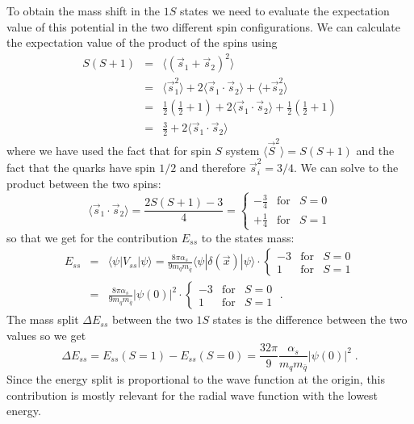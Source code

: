 \documentclass[12pt]{article}
\begin{document}
To obtain the mass shift in the $1S$ states we need to evaluate the expectation value of this potential in the two different spin configurations. We can calculate the expectation value of the product of the spins using
\begin{eqnarray*}
S(S+1)&=&\langle (\vec s_1 +\vec s_2)^2 \rangle\\
 &=& 
\langle \vec s_1 ^2 \rangle +2\langle \vec s_1 \cdot\vec s_2 \rangle +\langle +\vec s_2^2 \rangle \\
&=&
\frac{1}{2}\left(\frac{1}{2}+1\right)+2\langle \vec s_1 \cdot\vec s_2 \rangle + \frac{1}{2}\left(\frac{1}{2}+1\right)
\\&=&
\frac{3}{2}+2\langle \vec s_1 \cdot\vec s_2 \rangle
\end{eqnarray*}  
where we have used the fact that for spin $S$ system $\langle \vec S^2 \rangle=S(S+1)$ and the fact that the quarks have spin $1/2$ and therefore $\vec s_i^2=3/4$. We can solve to the product between the two spins:
\[\langle \vec s_1 \cdot\vec s_2 \rangle=\frac{2S(S+1)-3}{4}=\left\{\begin{array}{ccc}-\frac{3}{4}&\mbox{for}& S=0 \\ +\frac{1}{4}&\mbox{for}& S=1 \end{array}\right.\]
so that we get for the contribution $E_{ss}$ to the states mass:
\begin{eqnarray}\label{eq:1sMassSplit}
E_{ss}&=&
\langle \psi |V_{ss}|\psi\rangle = 
\frac{8\pi \alpha_s }{9m_q m_{\bar q}}\langle \psi|\delta(\vec x)|\psi\rangle \cdot\left\{\begin{array}{ccc}-3&\mbox{for}& S=0 \\ 1&\mbox{for}& S=1 \end{array}\right. \nonumber
\\
&=&
\frac{8\pi \alpha_s }{9m_q m_{\bar q}}\left|\psi(0)\right|^2 \cdot\left\{\begin{array}{ccc}-3&\mbox{for}& S=0 \\ 1&\mbox{for}& S=1 \end{array}\right. \;.
\end{eqnarray}
The mass split $\Delta E_{ss}$ between the two $1S$ states is the difference between the two values so we get
\[\Delta E_{ss}=E_{ss}(S=1)-E_{ss}(S=0)=\frac{32\pi}{9}\frac{\alpha_s }{m_q m_{\bar q}}\left|\psi(0)\right|^2\;.\]
Since the energy split is proportional to the wave function at the origin, this contribution is mostly relevant for the radial wave function with the lowest energy.
\end{document}
